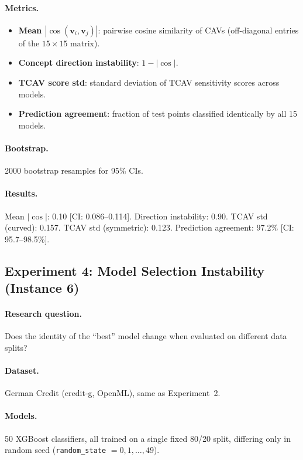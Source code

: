 \documentclass[11pt,a4paper]{article}
\begin{document}
\paragraph{Metrics.}
\begin{itemize}[nosep]
  \item \textbf{Mean $|\cos(\mathbf{v}_i, \mathbf{v}_j)|$}: pairwise cosine
    similarity of CAVs (off-diagonal entries of the $15 \times 15$ matrix).
  \item \textbf{Concept direction instability}: $1 - |\cos|$.
  \item \textbf{TCAV score std}: standard deviation of TCAV sensitivity scores
    across models.
  \item \textbf{Prediction agreement}: fraction of test points classified
    identically by all 15 models.
\end{itemize}

\paragraph{Bootstrap.}
2000 bootstrap resamples for 95\% CIs.

\paragraph{Results.}
Mean $|\cos|$: 0.10 [CI: 0.086--0.114].  Direction instability: 0.90.
TCAV std (curved): 0.157.  TCAV std (symmetric): 0.123.  Prediction
agreement: 97.2\% [CI: 95.7--98.5\%].

\subsection{Experiment 4: Model Selection Instability (Instance 6)}
\label{app:exp-model-selection}

\paragraph{Research question.}
Does the identity of the ``best'' model change when evaluated on different
data splits?

\paragraph{Dataset.}
German Credit (credit-g, OpenML), same as Experiment~2.

\paragraph{Models.}
50 XGBoost classifiers, all trained on a single fixed 80/20 split, differing
only in random seed (\texttt{random\_state} $= 0, 1, \ldots, 49$).
\end{document}
